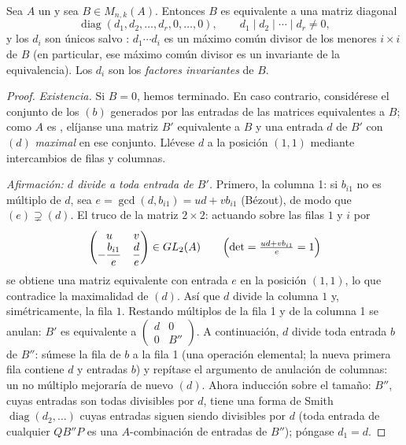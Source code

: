 \begin{theorem}\label{thm:b3:modules:smith}
Sea $A$ un  y sea $B \in M_{n,k}(A)$.
Entonces $B$ es equivalente a una matriz diagonal
\[
\operatorname{diag}(d_1, d_2, \dots, d_r, 0, \dots, 0),
\qquad d_1 \mid d_2 \mid \cdots \mid d_r \neq 0 ,
\]
y los $d_i$ son únicos salvo
: $d_1 \cdots d_i$ es un
máximo común divisor de los menores $i \times i$ de $B$ (en particular,
ese máximo común divisor es un invariante de la equivalencia). Los $d_i$
son los \emph{factores invariantes} de $B$.
\end{theorem}

\begin{proof}
\emph{Existencia.} Si $B = 0$, hemos terminado. En caso contrario,
considérese el conjunto de los 
$(b)$ generados por las entradas de las matrices equivalentes a $B$;
como $A$ es , elíjanse una
matriz $B'$ equivalente a $B$ y una entrada $d$ de $B'$ con $(d)$
\emph{maximal} en ese conjunto. Llévese $d$ a la posición $(1,1)$
mediante intercambios de filas y columnas.

\emph{Afirmación: $d$ divide a toda entrada de $B'$.} Primero, la
columna 1: si $b_{i1}$ no es múltiplo de $d$, sea
$e = \gcd(d, b_{i1}) = ud +
vb_{i1}$ (Bézout), de modo que $(e) \supsetneq (d)$. El truco de la
matriz $2 \times 2$: actuando sobre las filas $1$ y $i$ por
\[
\begin{pmatrix} u & v \\ -\dfrac{b_{i1}}e & \dfrac de
\end{pmatrix}
\in GL_2(A)
\qquad
\Bigl(\det = \tfrac{ud + v b_{i1}}e = 1\Bigr)
\]
se obtiene una matriz equivalente con entrada $e$ en la posición
$(1,1)$, lo que contradice la maximalidad de $(d)$. Así que $d$ divide
la columna $1$ y, simétricamente, la fila $1$. Restando múltiplos de la
fila 1 y de la columna 1 se anulan: $B'$ es equivalente a
$\begin{pmatrix} d &
0\\ 0 & B''\end{pmatrix}$. A continuación, $d$ divide toda entrada $b$
de $B''$: súmese la fila de $b$ a la fila 1 (una operación elemental; la
nueva primera fila contiene $d$ y entradas $b$) y repítase el argumento
de anulación de columnas: un no múltiplo mejoraría de nuevo $(d)$. Ahora
inducción sobre el tamaño: $B''$, cuyas entradas son todas divisibles
por $d$, tiene una forma de Smith $\operatorname{diag}(d_2,
\dots)$ cuyas entradas siguen siendo divisibles por $d$ (toda entrada de
cualquier $QB''P$ es una $A$-combinación de entradas de $B''$); póngase
$d_1 =
d$.


\end{proof}
